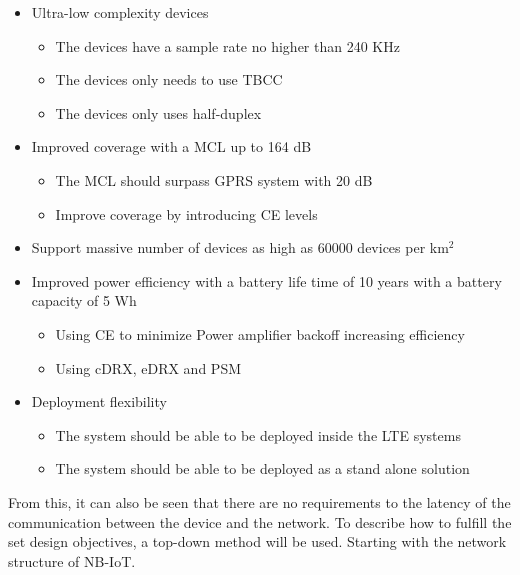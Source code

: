 \begin{itemize}
\item Ultra-low complexity devices
    \begin{itemize}
    \item The devices have a sample rate no higher than 240 KHz
    \item The devices only needs to use \gls{TBCC}
    \item The devices only uses half-duplex
    \end{itemize}
\item Improved coverage with a \gls{MCL} up to 164 dB
    \begin{itemize}
    \item The \gls{MCL} should surpass \gls{GPRS} system with 20 dB
    \item Improve coverage by introducing \gls{CE} levels 
    \end{itemize}
\item Support massive number of devices as high as 60000 devices per km$^2$
\item Improved power efficiency with a battery life time of 10 years with a battery capacity of 5 Wh
    \begin{itemize}
    \item Using \gls{CE} to minimize Power amplifier backoff increasing efficiency
    \item Using \gls{cDRX}, \gls{eDRX} and \gls{PSM} 
    \end{itemize}
\item Deployment flexibility
    \begin{itemize}
    \item The system should be able to be deployed inside the \gls{LTE} systems
    \item The system should be able to be deployed as a stand alone solution
    \end{itemize}
\end{itemize}

From this, it can also be seen that there are no requirements to the latency of the communication between the device and the network. To describe how to fulfill the set design objectives, a top-down method will be used. Starting with the network structure of \gls{NB-IoT}.




